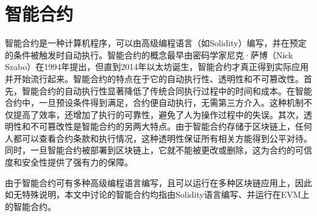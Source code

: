 \section{智能合约}
\label{sec:智能合约}
智能合约是一种计算机程序，可以由高级编程语言（如Solidity）编写，并在预定的条件被触发时自动执行。智能合约的概念最早由密码学家尼克·萨博（Nick Szabo）在1994年提出，但直到2014年以太坊诞生，智能合约才真正得到实际应用并开始流行起来。智能合约的特点在于它的自动执行性、透明性和不可篡改性。首先，智能合约的自动执行性显著降低了传统合同执行过程中的时间和成本。在智能合约中，一旦预设条件得到满足，合约便自动执行，无需第三方介入。这种机制不仅提高了效率，还增加了执行的可靠性，避免了人为操作过程中的失误。其次，透明性和不可篡改性是智能合约的另两大特点。由于智能合约存储于区块链上，任何人都可以查看合约条款和执行情况，这种透明性保证所有相关方能得到公平对待。同时，一旦智能合约被部署到区块链上，它就不能被更改或删除，这为合约的可信度和安全性提供了强有力的保障。

由于智能合约可有多种高级编程语言编写，且可以运行在多种区块链应用上，因此如无特殊说明，本文中讨论的智能合约均指由Solidity语言编写、并运行在EVM上的智能合约。
